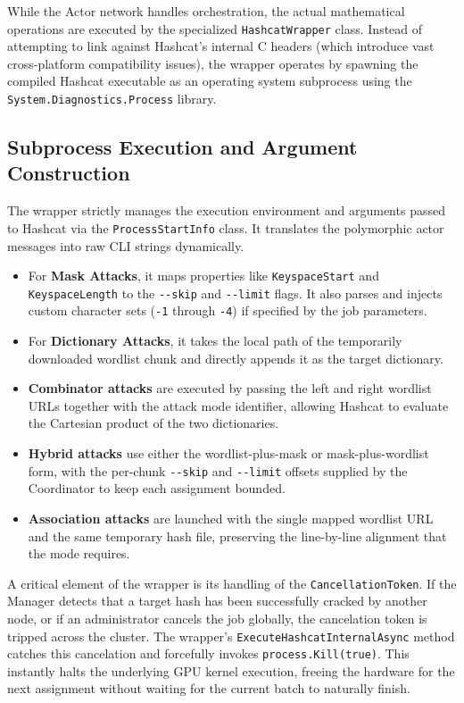 While the Actor network handles orchestration, the actual mathematical operations are executed by the specialized \verb|HashcatWrapper| class. Instead of attempting to link against Hashcat's internal C headers (which introduce vast cross-platform compatibility issues), the wrapper operates by spawning the compiled Hashcat executable as an operating system subprocess using the \verb|System.Diagnostics.Process| library.

\subsection{Subprocess Execution and Argument Construction}
\label{sec:hashcat_execution}
The wrapper strictly manages the execution environment and arguments passed to Hashcat via the \verb|ProcessStartInfo| class. It translates the polymorphic actor messages into raw CLI strings dynamically.
\begin{itemize}
    \item For \textbf{Mask Attacks}, it maps properties like \verb|KeyspaceStart| and \verb|KeyspaceLength| to the \verb|--skip| and \verb|--limit| flags. It also parses and injects custom character sets (\verb|-1| through \verb|-4|) if specified by the job parameters.
    \item For \textbf{Dictionary Attacks}, it takes the local path of the temporarily downloaded wordlist chunk and directly appends it as the target dictionary.

    \item \textbf{Combinator attacks} are executed by passing the left and right wordlist URLs together with the attack mode identifier, allowing Hashcat to evaluate the Cartesian product of the two dictionaries.
    
    \item \textbf{Hybrid attacks} use either the wordlist-plus-mask or mask-plus-wordlist form, with the per-chunk \verb|--skip| and \verb|--limit| offsets supplied by the Coordinator to keep each assignment bounded.
    
    \item \textbf{Association attacks} are launched with the single mapped wordlist URL and the same temporary hash file, preserving the line-by-line alignment that the mode requires.
\end{itemize}

A critical element of the wrapper is its handling of the \verb|CancellationToken|. If the Manager detects that a target hash has been successfully cracked by another node, or if an administrator cancels the job globally, the cancelation token is tripped across the cluster. The wrapper's \verb|ExecuteHashcatInternalAsync| method catches this cancelation and forcefully invokes \verb|process.Kill(true)|. This instantly halts the underlying GPU kernel execution, freeing the hardware for the next assignment without waiting for the current batch to naturally finish.

